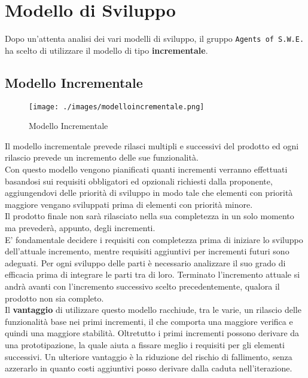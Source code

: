 \section{Modello di Sviluppo}
\label{ModelloSviluppo}

Dopo un'attenta analisi dei vari modelli di sviluppo, il gruppo \texttt{Agents of S.W.E.} ha scelto di utilizzare il modello di tipo \textbf{incrementale}.

\subsection{Modello Incrementale}

\begin{figure}[h]
	\centering
  		\texttt{[image: ./images/modelloincrementale.png]}
  		\caption{Modello Incrementale}
  		\label{fig:Modello Incrementale}
\end{figure}

Il modello incrementale prevede rilasci multipli e successivi del prodotto ed ogni rilascio prevede un incremento delle sue funzionalità. \\
Con questo modello vengono pianificati quanti incrementi verranno effettuati basandosi sui requisiti obbligatori ed opzionali richiesti dalla proponente, aggiungendovi delle priorità di sviluppo in modo tale che elementi con priorità maggiore vengano sviluppati prima di elementi con priorità minore.\\
Il prodotto finale non sarà rilasciato nella sua completezza in un solo momento ma prevederà, appunto, degli incrementi. \\
E' fondamentale decidere i requisiti con completezza prima di iniziare lo sviluppo dell'attuale incremento, mentre requisiti aggiuntivi per incrementi futuri sono adeguati. Per ogni sviluppo delle parti è necessario analizzare il suo grado di efficacia prima di integrare le parti tra di loro. Terminato l'incremento attuale si andrà avanti con l'incremento successivo scelto precedentemente, qualora il prodotto non sia completo. \\
Il \textbf{vantaggio} di utilizzare questo modello racchiude, tra le varie, un rilascio delle funzionalità base nei primi incrementi, il che comporta una maggiore verifica e quindi una maggiore stabilità. Oltretutto i primi incrementi possono derivare da una prototipazione, la quale aiuta a fissare meglio i requisiti per gli elementi successivi. Un ulteriore vantaggio è la riduzione del rischio di fallimento, senza azzerarlo in quanto costi aggiuntivi posso derivare dalla caduta nell'iterazione\glossario.

